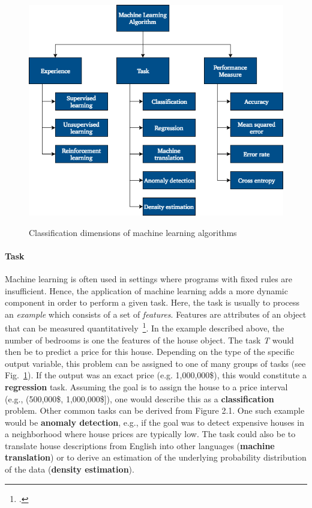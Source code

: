 \begin{figure}[h]
  \includegraphics[height=10cm]{img/ml_classification}
  \caption{Classification dimensions of machine learning algorithms}
\label{fig:ml_classification}
\end{figure}

\paragraph{Task}

Machine learning is often used in settings where programs with fixed rules are
insufficient. Hence, the application of machine learning adds a more dynamic
component in order to perform a given task. Here, the task is usually to process
an \textit{example} which consists of a set of \textit{features}. Features are
attributes of an object that can be measured quantitatively~\footcite{Goodfellow2016}. 
In the example described above, the number of bedrooms is one the features of 
the house object. The task \textit{T} would then be to predict a price for this 
house. Depending on the type of the specific output variable, this problem can 
be assigned to one of many groups of tasks (see Fig.~\ref{fig:ml_classification}). If the output was an
exact price (e.g. 1,000,000\$), this would constitute a \textbf{regression} task. 
Assuming the goal is to assign the house to a price interval (e.g., (500,000\$, 1,000,000\$]),
one would describe this as a \textbf{classification} problem. Other common tasks
can be derived from Figure 2.1. One such example would be \textbf{anomaly detection}, e.g.,
if the goal was to detect expensive houses in a neighborhood where house prices
are typically low. The task could also be to translate house descriptions from
English into other languages (\textbf{machine translation}) or to derive an
estimation of the underlying probability distribution of the data (\textbf{density estimation}).

